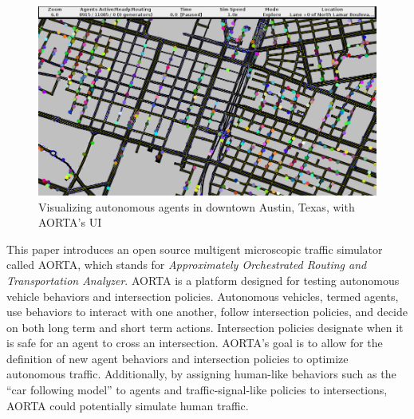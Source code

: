 \documentclass[letterpaper, 10 pt, conference]{ieeeconf}  %
\begin{document}

\begin{figure}[t]
  \centering \includegraphics[width=0.9\linewidth]{downtown_atx.png}
  \caption{Visualizing autonomous agents in downtown Austin, Texas, with AORTA's UI}
  \label{fig:ui_screenshot}
  \vspace{-20pt}
\end{figure}


This paper introduces an open source multigent microscopic traffic simulator
called AORTA, which stands for \textit{Approximately Orchestrated Routing and
Transportation Analyzer}. AORTA is a platform designed for testing autonomous
vehicle behaviors and intersection policies. Autonomous vehicles, termed agents,
use behaviors to interact with one another, follow intersection policies, and
decide on both long term and short term actions. Intersection policies designate
when it is safe for an agent to cross an intersection.  AORTA's goal is to allow
for the definition of new agent behaviors and intersection policies to optimize
autonomous traffic. Additionally, by assigning human-like behaviors such as the
``car following model'' \cite{brackstone1999car} to agents and
traffic-signal-like policies to intersections, AORTA could potentially simulate
human traffic.
\end{document}
